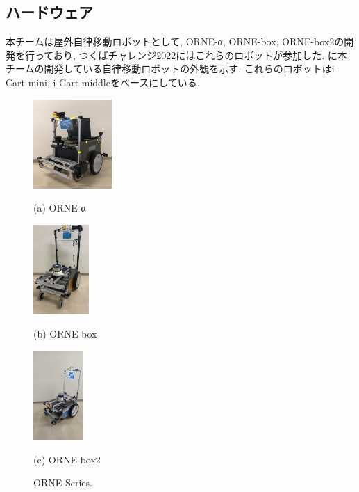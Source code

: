 \documentclass[uplatex, twocolumn, 9pt]{jsproceedings}
\begin{document}
\subsection{ハードウェア}
本チームは屋外自律移動ロボットとして, ORNE-α, ORNE-box, ORNE-box2の開発を行っており, つくばチャレンジ2022にはこれらのロボットが参加した. に本チームの開発している自律移動ロボットの外観を示す. これらのロボットはi-Cart mini, i-Cart middleをベースにしている.

\begin{figure}[h]
  \centering
  \begin{minipage}[b]{0.3\linewidth}
    \centering
    \includegraphics[width=30mm]{fig/alpha.pdf}
    \caption*{(a) ORNE-α}
  \end{minipage} 
  \hspace{0.03\columnwidth}
  \begin{minipage}[b]{0.3\linewidth}
    \centering
    \includegraphics[height=34mm]{fig/boxkai.pdf}
    \caption*{(b) ORNE-box}
  \end{minipage}
  \begin{minipage}[b]{0.3\linewidth}
    \centering
    \includegraphics[height=34mm]{fig/box2kai.pdf}
    \caption*{(c) ORNE-box2}
  \end{minipage}
  \caption{ORNE-Series.}
  \label{fig:orne-series}%
\end{figure}
\end{document}
